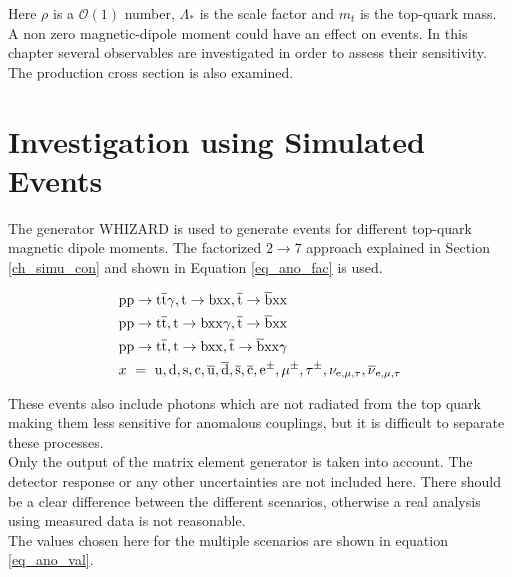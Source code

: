 Here $\rho$ is a $\mathcal{O}(1)$ number, $\Lambda_{\ast}$ is the scale factor and $m_t$ is the top-quark mass.\\
A non zero magnetic-dipole moment could have an effect on \ttgamma events. In this chapter several observables are investigated in order to assess their sensitivity. The production cross section is also examined.

\section{Investigation using Simulated Events}

The generator WHIZARD is used to generate events for different top-quark magnetic dipole moments. The factorized $2 \to 7$ approach explained in Section \ref{ch_simu_con} and shown in Equation \ref{eq_ano_fac} is used.

\begin{equation}
\begin{split}
& \mathrm{pp}\to \mathrm{t}\overline{\mathrm{t}} \gamma,  \mathrm{t} \to \mathrm{bxx},  \overline{\mathrm{t}} \to \overline{\mathrm{b}} \mathrm{xx} \\
& \mathrm{pp}\to \mathrm{t} \overline{\mathrm{t}},  \mathrm{t} \to \mathrm{bxx} \gamma,  \overline{\mathrm{t}} \to \overline{\mathrm{b}} \mathrm{xx} \\
& \mathrm{pp}\to \mathrm{t} \overline{\mathrm{t}},  \mathrm{t} \to \mathrm{bxx},  \overline{\mathrm{t}} \to \overline{\mathrm{b}} \mathrm{xx} \gamma \\
&  x\ = \ \mathrm{u}, \mathrm{d}, \mathrm{s}, \mathrm{c}, \overline{\mathrm{u}}, \overline{\mathrm{d}},  \overline{\mathrm{s}},  \overline{\mathrm{c}}, \mathrm{e}^{\pm}, \mu^{\pm}, \tau^{\pm}, \nu_{\mathrm{e},\mu,\tau}, \overline{\nu}_{\mathrm{e},\mu,\tau} 
\end{split}
\label{eq_ano_fac}
\end{equation}

These events also include photons which are not radiated from the top quark making them less sensitive for anomalous couplings, but it is difficult to separate these processes.\\
Only the output of the matrix element generator is taken into account. The detector response or any other uncertainties are not included here.
There should be a clear difference between the different scenarios, otherwise a real analysis using measured data is not reasonable.\\
The values chosen here for the multiple scenarios are shown in equation \ref{eq_ano_val}.

